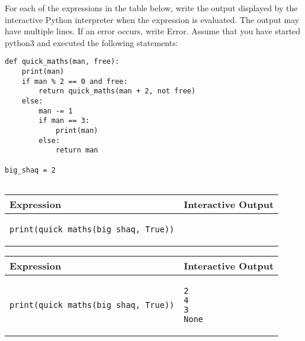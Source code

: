 \begin{blocksection}
\question For each of the expressions in the table below, write the output displayed by the interactive Python interpreter when the expression is evaluated. The output may have multiple lines. If an error occurs, write Error. Assume that you have started python3 and executed the following statements:


\begin{lstlisting}
def quick_maths(man, free):    
    print(man)
    if man % 2 == 0 and free:
        return quick_maths(man + 2, not free)
    else:
        man -= 1
        if man == 3:
            print(man)
        else:
            return man
						
big_shaq = 2
    
\end{lstlisting}

\begin{center}
\begin{tabular}{|p{10cm}|p{5cm}|} 
\hline
\textbf{Expression} & \textbf{Interactive Output} \\ 
\hline
\rule{0pt}{3ex}
\begin{lstlisting}
print(quick_maths(big_shaq, True))
\end{lstlisting}
&  \\ 
\hline
\end{tabular}
\end{center}


\begin{solution}[1.5in]
\begin{center}
\begin{tabular}{|p{8cm}|p{6cm}|} 
\hline
\textbf{Expression} & \textbf{Interactive Output} \\ 
\hline
\rule{0pt}{4ex}
\begin{lstlisting}
print(quick_maths(big_shaq, True))
\end{lstlisting}
&  
\begin{lstlisting}
2
4
3
None
\end{lstlisting}\\ 
\hline
\end{tabular}
\end{center}

\end{solution}
\end{blocksection}